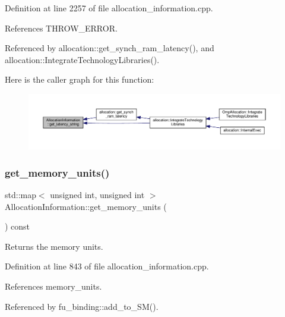 Definition at line 2257 of file allocation\+\_\+information.\+cpp.



References T\+H\+R\+O\+W\+\_\+\+E\+R\+R\+OR.



Referenced by allocation\+::get\+\_\+synch\+\_\+ram\+\_\+latency(), and allocation\+::\+Integrate\+Technology\+Libraries().

Here is the caller graph for this function\+:
\nopagebreak
\begin{figure}[H]
\begin{center}
\leavevmode
\includegraphics[width=350pt]{d7/d79/classAllocationInformation_a0fcc083348815a0f1e64767c4ce3aa89_icgraph}
\end{center}
\end{figure}
\mbox{\label{classAllocationInformation_a57e73fc90d331eb1b943123f1bba095e}} 
\subsubsection{\texorpdfstring{get\+\_\+memory\+\_\+units()}{get\_memory\_units()}}
{\footnotesize\ttfamily std\+::map$<$ unsigned int, unsigned int $>$ Allocation\+Information\+::get\+\_\+memory\+\_\+units (\begin{DoxyParamCaption}{ }\end{DoxyParamCaption}) const}



Returns the memory units. 



Definition at line 843 of file allocation\+\_\+information.\+cpp.



References memory\+\_\+units.



Referenced by fu\+\_\+binding\+::add\+\_\+to\+\_\+\+S\+M().

